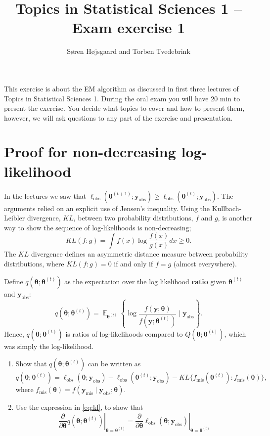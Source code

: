 \documentclass{article}
\DeclareMathOperator{\E}{\mathbb{E}}
\newcommand{\diff}[1]{\ensuremath{{\frac{\partial}{\partial#1}}}}
\newcommand{\by}{\ensuremath{\bm{y}}}
\newcommand{\bym}{\ensuremath{{\bm{y}_\text{mis}}}}
\newcommand{\byo}{\ensuremath{{\bm{y}_\text{obs}}}}
\newcommand{\bt}{\ensuremath{{\bm{\theta}}}}
\newcommand{\bti}[1]{\ensuremath{{\bm{\theta}^{(#1)}}}}
\begin{document}
\title{Topics in Statistical Sciences 1 -- Exam exercise 1}
\author{S{\o}ren H{\o}jsgaard and Torben Tvedebrink}

\maketitle

This exercise is about the EM algorithm as discussed in first three
lectures of Topics in Statistical Sciences 1. During the oral exam you
will have 20 min to present the exercise. You decide what topics to
cover and how to present them, however, we will ask questions to any
part of the exercise and presentation.

\section{Proof for non-decreasing log-likelihood}
\label{sec:proof-non-decreasing}

In the lectures we saw that $\ell_\text{obs}(\bti{t+1};\byo) \ge
\ell_\text{obs}(\bti{t};\byo)$. The arguments relied on an explicit
use of Jensen's inequality. Using the Kullbach-Leibler divergence,
$KL$, between two probability distributions, $f$ and $g$, is another
way to show the sequence of log-likelihoods is non-decreasing;
\begin{displaymath}
  KL(f : g) = \int f(x) \log\frac{f(x)}{g(x)} dx \ge 0.
\end{displaymath}
The $KL$ divergence defines an asymmetric distance measure between
probability distributions, where $KL(f : g) = 0$ if and only if $f=g$
(almost everywhere).

Define $q(\bt;\bti{t})$ as the expectation over the log likelihood
\textbf{ratio} given $\bti{t}$ and $\byo$:
\begin{displaymath}
  q(\bt;\bti{t}) =
  \E_{\bti{t}}\left\{\log\frac{f(\by;\bt)}{f(\by;\bti{t})} \;\Big|\; \byo\right\}.
\end{displaymath}
Hence, $q(\bt;\bti{t})$ is ratios of log-likelihoods compared to
$Q(\bt;\bti{t})$, which was simply the log-likelihood.

\begin{enumerate}
\item Show that $q(\bt;\bti{t})$ can be written as
  \begin{equation}
    q(\bt;\bti{t}) = \ell_\text{obs}(\bt;\byo) - \ell_\text{obs}(\bti{t};\byo) -
    KL\{f_\text{mis}(\bti{t}) : f_\text{mis}(\bt)\}, \label{eq:kl}
  \end{equation}
  where $f_\text{mis}(\bt) = f(\bym\mid\byo;\bt)$.
\item Use the expression in \eqref{eq:kl}, to show that
  \begin{displaymath}
    \left.\diff{\bt} q(\bt;\bti{t})\right|_{\bt=\bti{t}} = 
    \left.\diff{\bt} \ell_\text{obs}(\bt;\byo)\right|_{\bt=\bti{t}}
  \end{displaymath}
\end{enumerate}
\end{document}
